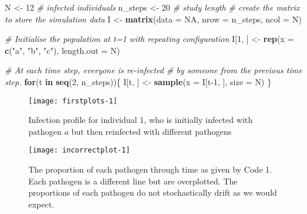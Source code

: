 \documentclass[]{elsarticle} %
\newenvironment{Shaded}{\begin{snugshade}}{\end{snugshade}}
\newcommand{\CommentTok}[1]{\textcolor[rgb]{0.56,0.35,0.01}{\textit{#1}}}
\newcommand{\ControlFlowTok}[1]{\textcolor[rgb]{0.13,0.29,0.53}{\textbf{#1}}}
\newcommand{\DataTypeTok}[1]{\textcolor[rgb]{0.13,0.29,0.53}{#1}}
\newcommand{\DecValTok}[1]{\textcolor[rgb]{0.00,0.00,0.81}{#1}}
\newcommand{\KeywordTok}[1]{\textcolor[rgb]{0.13,0.29,0.53}{\textbf{#1}}}
\newcommand{\NormalTok}[1]{#1}
\newcommand{\OtherTok}[1]{\textcolor[rgb]{0.56,0.35,0.01}{#1}}
\newcommand{\StringTok}[1]{\textcolor[rgb]{0.31,0.60,0.02}{#1}}
\begin{document}
\begin{Shaded}
\begin{Highlighting}[]
\NormalTok{N <-}\StringTok{ }\DecValTok{12} \CommentTok{# infected individuals}
\NormalTok{n_steps <-}\StringTok{ }\DecValTok{20} \CommentTok{# study length}
\CommentTok{# create the matrix to store the simulation data}
\NormalTok{I <-}\StringTok{ }\KeywordTok{matrix}\NormalTok{(}\DataTypeTok{data =} \OtherTok{NA}\NormalTok{, }\DataTypeTok{nrow =}\NormalTok{ n_steps, }\DataTypeTok{ncol =}\NormalTok{ N)}

\CommentTok{# Initialise the population at t=1 with repeating configuration}
\NormalTok{I[}\DecValTok{1}\NormalTok{, ] <-}\StringTok{ }\KeywordTok{rep}\NormalTok{(}\DataTypeTok{x =} \KeywordTok{c}\NormalTok{(}\StringTok{"a"}\NormalTok{, }\StringTok{"b"}\NormalTok{, }\StringTok{"c"}\NormalTok{), }\DataTypeTok{length.out =}\NormalTok{ N)}

\CommentTok{# At each time step, everyone is re-infected }
\CommentTok{# by someone from the previous time step.}
\ControlFlowTok{for}\NormalTok{(t }\ControlFlowTok{in} \KeywordTok{seq}\NormalTok{(}\DecValTok{2}\NormalTok{, n_steps))\{}
\NormalTok{  I[t, ] <-}\StringTok{ }\KeywordTok{sample}\NormalTok{(}\DataTypeTok{x =}\NormalTok{ I[t}\DecValTok{-1}\NormalTok{, ], }\DataTypeTok{size =}\NormalTok{ N)}
\NormalTok{\}}
\end{Highlighting}
\end{Shaded}

\begin{figure}[h]

{\centering \texttt{[image: firstplots-1]} 

}

\caption{Infection profile for individual 1, who is initially infected with pathogen $a$ but then reinfected with different pathogens}\label{fig:firstplots}
\end{figure}

\begin{figure}[h]

{\centering \texttt{[image: incorrectplot-1]} 

}

\caption{ The proportion of each pathogen through time as given by Code 1. Each pathogen is a different line but are overplotted. The proportions of each pathogen do not stochastically drift as we would expect.}\label{fig:incorrectplot}
\end{figure}
\end{document}
